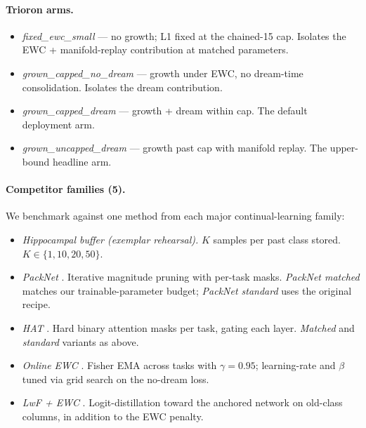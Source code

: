 \documentclass[11pt]{article}
\begin{document}
\paragraph{Trioron arms.}
\begin{itemize}[leftmargin=1.5em]
  \item \emph{fixed\_ewc\_small} --- no growth; L1 fixed at the
        chained-15 cap. Isolates the EWC + manifold-replay contribution at
        matched parameters.
  \item \emph{grown\_capped\_no\_dream} --- growth under EWC, no
        dream-time consolidation. Isolates the dream contribution.
  \item \emph{grown\_capped\_dream} --- growth + dream within cap. The
        default deployment arm.
  \item \emph{grown\_uncapped\_dream} --- growth past cap with manifold
        replay. The upper-bound headline arm.
\end{itemize}

\paragraph{Competitor families (5).}
We benchmark against one method from each major continual-learning
family:
\begin{itemize}[leftmargin=1.5em]
  \item \emph{Hippocampal buffer (exemplar rehearsal).} $K$ samples per
        past class stored. $K \in \{1, 10, 20, 50\}$.
  \item \emph{PackNet} \citep{mallya2018packnet}. Iterative magnitude
        pruning with per-task masks. \emph{PackNet matched} matches our
        trainable-parameter budget; \emph{PackNet standard} uses the
        original recipe.
  \item \emph{HAT} \citep{serra2018hat}. Hard binary attention masks per
        task, gating each layer. \emph{Matched} and \emph{standard}
        variants as above.
  \item \emph{Online EWC} \citep{schwarz2018progress}. Fisher EMA across tasks
        with $\gamma = 0.95$; learning-rate and $\beta$ tuned via grid
        search on the no-dream loss.
  \item \emph{LwF + EWC} \citep{li2018lwf, kirkpatrick2017overcoming}.
        Logit-distillation toward the anchored network on old-class
        columns, in addition to the EWC penalty.
\end{itemize}
\end{document}
